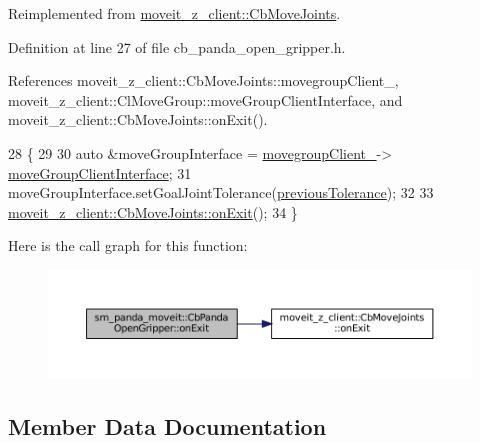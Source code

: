Reimplemented from \hyperlink{classmoveit__z__client_1_1CbMoveJoints_a104abb9c8f8ebb04a6e5c8e84b473add}{moveit\+\_\+z\+\_\+client\+::\+Cb\+Move\+Joints}.



Definition at line 27 of file cb\+\_\+panda\+\_\+open\+\_\+gripper.\+h.



References moveit\+\_\+z\+\_\+client\+::\+Cb\+Move\+Joints\+::movegroup\+Client\+\_\+, moveit\+\_\+z\+\_\+client\+::\+Cl\+Move\+Group\+::move\+Group\+Client\+Interface, and moveit\+\_\+z\+\_\+client\+::\+Cb\+Move\+Joints\+::on\+Exit().


\begin{DoxyCode}
28     \{
29 
30         \textcolor{keyword}{auto} &moveGroupInterface = \hyperlink{classmoveit__z__client_1_1CbMoveJoints_a2ce2e613b676025766dcd2f01ae50810}{movegroupClient\_}->
      \hyperlink{classmoveit__z__client_1_1ClMoveGroup_af86e046b837be0ef4afa9893d8808f20}{moveGroupClientInterface};
31         moveGroupInterface.setGoalJointTolerance(\hyperlink{classsm__panda__moveit_1_1CbPandaOpenGripper_add6c758e01a2c484debb3ccf48e4597d}{previousTolerance});
32 
33         \hyperlink{classmoveit__z__client_1_1CbMoveJoints_a104abb9c8f8ebb04a6e5c8e84b473add}{moveit\_z\_client::CbMoveJoints::onExit}();
34     \}
\end{DoxyCode}
Here is the call graph for this function\+:
\nopagebreak
\begin{figure}[H]
\begin{center}
\leavevmode
\includegraphics[width=350pt]{classsm__panda__moveit_1_1CbPandaOpenGripper_a40378849466821989b11f0561945f8fe_cgraph}
\end{center}
\end{figure}


\subsection{Member Data Documentation}
\mbox{\label{classsm__panda__moveit_1_1CbPandaOpenGripper_add6c758e01a2c484debb3ccf48e4597d}} 
